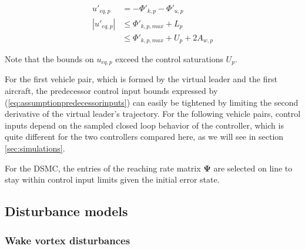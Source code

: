 \documentclass{ifacconf}
\providecommand{\mbf}[1]{\mathbf{#1}}
\newcommand{\idxAxis}{{\ensuremath{p}}}
\begin{document}
\begin{align}
{u}'_{eq,\idxAxis} &= - {\Phi}'_{k, \idxAxis} - {\Phi}'_{u, \idxAxis}\\
|{u}'_{eq,\idxAxis}| &\leq {\Phi}'_{k, \idxAxis, max} + L_\idxAxis \\
{} &\leq {\Phi}'_{k, \idxAxis, max} + U_\idxAxis + 2 A_{w,\idxAxis}
\end{align}

Note that the bounds on $u_{eq,\idxAxis} $ exceed the control saturations $U_\idxAxis$.

For the first vehicle pair, which is formed by the virtual leader and the first aircraft, the predecessor control input bounds expressed by (\ref{eq:assumptionpredecessorinputs}) can easily be tightened by limiting the second derivative of the virtual leader's trajectory. For the following vehicle pairs, control inputs depend on the sampled closed loop behavior of the controller, which is quite different for the two controllers compared here, as we will see in section \ref{sec:simulations}.


For the DSMC, the entries of the reaching rate matrix $\mbf{\Psi}$ are selected on line to stay within control input limits given the initial error state.

\subsection{Disturbance models}

\subsubsection{Wake vortex disturbances}
\end{document}
